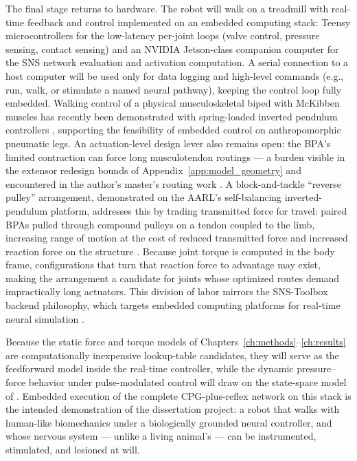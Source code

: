 The final stage returns to hardware. The robot will walk on a treadmill with real-time feedback and control implemented on an embedded computing stack: Teensy microcontrollers for the low-latency per-joint loops (valve control, pressure sensing, contact sensing) and an NVIDIA Jetson-class companion computer for the SNS network evaluation and activation computation. A serial connection to a host computer will be used only for data logging and high-level commands (e.g., run, walk, or stimulate a named neural pathway), keeping the control loop fully embedded. Walking control of a physical musculoskeletal biped with McKibben muscles has recently been demonstrated with spring-loaded inverted pendulum controllers \citep{li_controller_2024}, supporting the feasibility of embedded control on anthropomorphic pneumatic legs. An actuation-level design lever also remains open: the BPA's limited contraction can force long musculotendon routings --- a burden visible in the extensor redesign bounds of Appendix~\ref{app:model_geometry} and encountered in the author's master's routing work \citep{bolen_determination_2019}. A block-and-tackle ``reverse pulley'' arrangement, demonstrated on the AARL's self-balancing inverted-pendulum platform, addresses this by trading transmitted force for travel: paired BPAs pulled through compound pulleys on a tendon coupled to the limb, increasing range of motion at the cost of reduced transmitted force and increased reaction force on the structure \citep{bolen_balance_2024, bolen_selfbalancing_2024, bolen_selfbalancing_srs_2024}. Because joint torque is computed in the body frame, configurations that turn that reaction force to advantage may exist, making the arrangement a candidate for joints whose optimized routes demand impractically long actuators. This division of labor mirrors the SNS-Toolbox backend philosophy, which targets embedded computing platforms for real-time neural simulation \citep{nourse_sns_2023}.

Because the static force and torque models of Chapters~\ref{ch:methods}--\ref{ch:results} are computationally inexpensive lookup-table candidates, they will serve as the feedforward model inside the real-time controller, while the dynamic pressure--force behavior under pulse-modulated control will draw on the state-space model of \citet{elzein_pressure_2025}. Embedded execution of the complete CPG-plus-reflex network on this stack is the intended demonstration of the dissertation project: a robot that walks with human-like biomechanics under a biologically grounded neural controller, and whose nervous system --- unlike a living animal's --- can be instrumented, stimulated, and lesioned at will.


